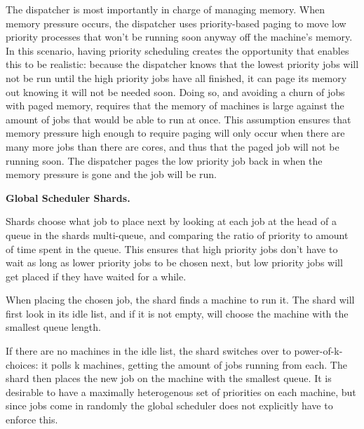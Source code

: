 The dispatcher is most importantly in charge of managing memory. When memory
pressure occurs, the dispatcher uses priority-based paging to move low priority
processes that won't be running soon anyway off the machine's memory. In this
scenario, having priority scheduling creates the opportunity that enables this
to be realistic: because the dispatcher knows that the lowest priority jobs will
not be run until the high priority jobs have all finished, it can page its
memory out knowing it will not be needed soon. Doing so, and avoiding a churn of
jobs with paged memory, requires that the memory of machines is large against
the amount of jobs that would be able to run at once. This assumption ensures
that memory pressure high enough to require paging will only occur when there
are many more jobs than there are cores, and thus that the paged job will not be
running soon. The dispatcher pages the low priority job back in when the memory
pressure is gone and the job will be run.



\textbf{Global Scheduler Shards.}

Shards choose what job to place next by looking at each job at the head of a
queue in the shards multi-queue, and comparing the ratio of priority to amount
of time spent in the queue. This ensures that high priority jobs don't have to
wait as long as lower priority jobs to be chosen next, but low priority jobs
will get placed if they have waited for a while.

When placing the chosen job, the shard finds a machine to run it. The shard will
first look in its idle list, and if it is not empty, will choose the machine with
the smallest queue length.

If there are no machines in the idle list, the shard switches over to
power-of-k-choices: it polls k machines, getting the amount of jobs running from
each. The shard then places the new job on the machine with the smallest queue.
It is desirable to have a maximally heterogenous set of priorities on each
machine, but since jobs come in randomly the global scheduler does not
explicitly have to enforce this.
